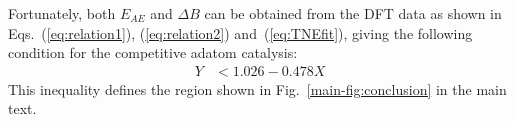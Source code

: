 \documentclass[aps,prl,reprint,amsmath,amssymb,floatfix,notitlepage]{revtex4-1}
\begin{document}
Fortunately, both $E_{AE}$ and $\Delta B$ can be obtained from the DFT data as shown in Eqs.~(\ref{eq:relation1}), (\ref{eq:relation2}) and~(\ref{eq:TNEfit}), giving the following condition for the competitive adatom catalysis:
%
\begin{equation}
\begin{split}
Y &< 1.026 - 0.478 X
\end{split}
\end{equation}
%
This inequality defines the region shown in Fig.~\ref{main-fig:conclusion} in the main text.



\end{document}
